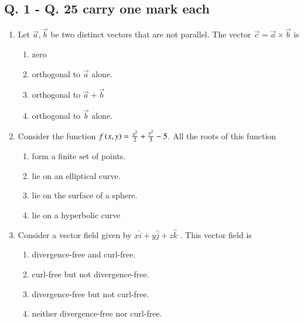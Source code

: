 \documentclass[journal,12pt,onecolumn]{IEEEtran}
\theoremstyle{remark}
\begin{document}
\subsection{\textbf{Q. 1 - Q. 25 carry one mark each}}
\begin{enumerate}
    \item Let $\vec{a} , \vec{b}$ be two distinct vectors that are not parallel. The vector $\vec{c} = \vec{a} \times \vec{b}$ is 
    \begin{enumerate}
        \item zero
        \item orthogonal to $\vec{a}$ alone.
        \item orthogonal to $\vec{a}+\vec{b}$
        \item orthogonal to $\vec{b}$ alone.
    \end{enumerate}
    \item Consider the function $f\left(x,y\right) = \frac{x^2}{2}+\frac{y^2}{3} -5$. All the roots of this function
    \begin{enumerate}
\item  form a finite set of points.
\item  lie on an elliptical curve.
\item  lie on the surface of a sphere.
\item  lie on a hyperbolic curve
\end{enumerate}
\item Consider a vector field given by $x\hat{i}+y\hat{j}+z\hat{k}$ . This vector field is
\begin{enumerate}
\item  divergence-free and curl-free.
\item  curl-free but not divergence-free.
\item  divergence-free but not curl-free.
\item  neither divergence-free nor curl-free.
\end{enumerate}
\end{enumerate}

      
       
\end{document}
